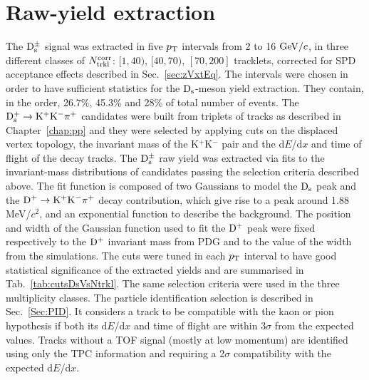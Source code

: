 \section {Raw-yield extraction}
\label{sec:Rawyields_vs_mult}
The ${\rm D_s^{\pm}}$ signal was extracted in five $p_{\rm T}$ intervals from 2 to 16 $\mathrm{GeV}/c$, 
in three different classes of $N_{\rm trkl}^{\rm corr}$: $[1,40)$, $[40,70)$, $[70,200]$ tracklets,
corrected for SPD acceptance effects described in Sec.~\ref{sec:zVxtEq}.
The intervals were chosen in order to have sufficient statistics for the ${\rm D_s}$-meson yield extraction.
They contain, in the order, 26.7\%, 45.3\% and 28\% of total number of events.
The ${\rm D^{+}_\mathrm{s}\to K^+ K^-\pi^+}$ candidates were built from triplets of tracks as described in Chapter~\ref{chap:pp}
and they were selected by applying cuts on the displaced vertex topology, the
invariant mass of the K$^+$K$^-$ pair and the d$E$/d$x$ and time of flight of the decay tracks.
The ${\rm D_s^{\pm}}$ raw yield was extracted via fits to the invariant-mass distributions of candidates passing the
selection criteria described above. The fit function is composed of two Gaussians to model
the ${\rm D_s}$ peak and the ${\rm D^{+}\to K^+ K^-\pi^+}$ decay contribution, which give rise to a peak around 1.88 MeV/$c^2$, 
and an exponential function to describe the background.
The position and width of the Gaussian function used to fit the ${\rm D^+}$ peak 
were fixed respectively to the ${\rm D^+}$ invariant mass from PDG and to the value of the width from the simulations.
The cuts were tuned in each $p_{\rm T}$ interval to have good statistical significance of the extracted yields
and are summarised in Tab.~\ref{tab:cutsDsVsNtrkl}. The same selection criteria
were used in the three multiplicity classes. The particle identification selection is described in Sec.~\ref{Sec:PID}. 
It considers a track to be compatible with the kaon or pion hypothesis if both its d$E$/d$x$ and time of flight 
are within 3$\sigma$ from the expected values. Tracks without a TOF signal 
(mostly at low momentum) are identified using only the TPC information and requiring a 2$\sigma$ 
compatibility with the expected d$E$/d$x$. 
